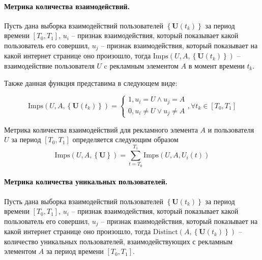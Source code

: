     \paragraph{Метрика количества взаимодействий.} 
    Пусть дана выборка взаимодействий пользователей
    $\left\{\mathbf{U}\left(t_k\right)\right\}$ за период времени $\left[T_0, T_1\right]$, $u_i$ -- признак взаимодействия,
    который показывает какой пользователь его совершил, $u_j$ -- признак взаимодействия, который показывает на какой
    интернет странице оно произошло, тогда  $\text{Imps} \left( U, A, \left\{\mathbf{U}\left(t_k\right)\right\} \right)$ 
    -- взаимодействие пользователя $U$ c рекламным элементом $A$ в момент времени $t_k$.

    Также данная функция представима в следующем виде:

    \begin{equation}
        \text{Imps} \left( U, A, \left\{\mathbf{U}\left(t_k\right)\right\} \right) =
        \begin{cases}
            1, u_i = U \wedge u_j = A  \\
            0, u_i \neq U \vee u_j \neq A
        \end{cases}, \forall t_k \in \left[T_0, T_1\right]
    \end{equation}

    Метрика количества взаимодействий для рекламного элемента $A$ и пользователя $U$ за период $[T_0, T_1]$ 
    определяется следующим образом
    \begin{equation}
        \text{Imps} \left( U, A, \left\{\mathbf{U}\right\} \right) =
        \sum \limits_{t=T_0}^{T_1} \text{Imps} \left( U, A, U_i (t) \right) 
    \end{equation}


    \paragraph{Метрика количества уникальных пользователей.} Пусть дана выборка взаимодействий
    пользователей $\left\{\mathbf{U}\left(t_k\right)\right\}$ за период времени $[T_0, T_1]$,  $u_i$ -- признак 
    взаимодействия, который показывает какой пользователь его совершил, $u_j$ -- признак взаимодействия, 
    который показывает на какой интернет странице оно произошло, тогда
    $\text{Distinct}\left( A, \left\{\mathbf{U}\left(t_k\right)\right\} \right)$ -- количество 
    уникальных пользователей, взаимодействующих с рекламным элементом $A$ за период времени $[T_0, T_1]$.

